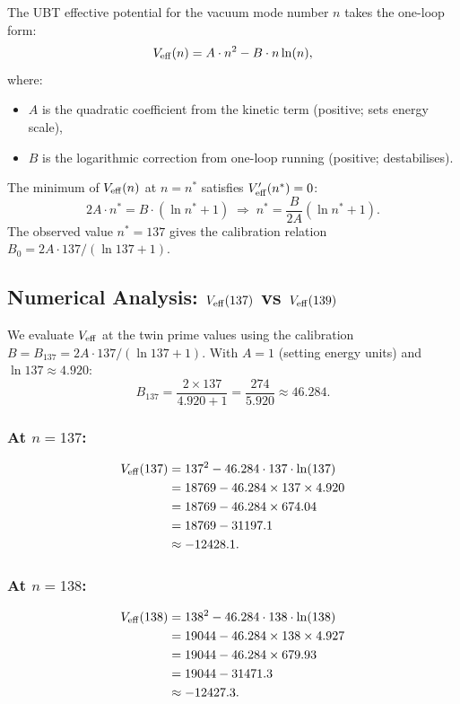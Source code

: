 \documentclass[12pt]{article}
\theoremstyle{definition}
\theoremstyle{remark}
\begin{document}
The UBT effective potential for the vacuum mode number $n$ takes the one-loop form:
\begin{equation}
  V_{\rm eff}(n) = A\cdot n^2 - B\cdot n\ln(n),
  \label{eq:Veff}
\end{equation}
where:
\begin{itemize}
  \item $A$ is the quadratic coefficient from the kinetic term (positive; sets energy scale),
  \item $B$ is the logarithmic correction from one-loop running (positive; destabilises).
\end{itemize}

The minimum of $V_{\rm eff}(n)$ at $n = n^*$ satisfies $V_{\rm eff}'(n^*) = 0$:
\begin{equation}
  2A\cdot n^* = B\cdot (\ln n^* + 1)
  \;\Longrightarrow\;
  n^* = \frac{B}{2A}\left(\ln n^* + 1\right).
  \label{eq:minimum_condition}
\end{equation}
The observed value $n^* = 137$ gives the calibration relation
$B_0 = 2A\cdot 137 / (\ln 137 + 1)$.

\subsection{Numerical Analysis: $V_{\rm eff}(137)$ vs $V_{\rm eff}(139)$}

We evaluate $V_{\rm eff}$ at the twin prime values using the calibration
$B = B_{137} = 2A \cdot 137/(\ln 137 + 1)$.
With $A=1$ (setting energy units) and $\ln 137 \approx 4.920$:
\begin{equation}
  B_{137} = \frac{2 \times 137}{4.920 + 1} = \frac{274}{5.920} \approx 46.284.
  \label{eq:B137}
\end{equation}

\subsubsection{At $n = 137$:}
\begin{align}
  V_{\rm eff}(137) &= 137^2 - 46.284 \cdot 137 \cdot \ln(137) \notag\\
  &= 18769 - 46.284 \times 137 \times 4.920 \notag\\
  &= 18769 - 46.284 \times 674.04 \notag\\
  &= 18769 - 31197.1 \notag\\
  &\approx -12428.1.
  \label{eq:Veff137}
\end{align}

\subsubsection{At $n = 138$:}
\begin{align}
  V_{\rm eff}(138) &= 138^2 - 46.284 \cdot 138 \cdot \ln(138) \notag\\
  &= 19044 - 46.284 \times 138 \times 4.927 \notag\\
  &= 19044 - 46.284 \times 679.93 \notag\\
  &= 19044 - 31471.3 \notag\\
  &\approx -12427.3.
  \label{eq:Veff138}
\end{align}
\end{document}
